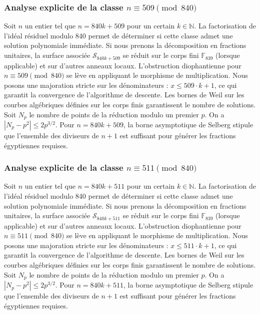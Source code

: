 \documentclass[11pt,a4paper]{article}
\begin{document}
\subsubsection{Analyse explicite de la classe $n \equiv 509 \pmod{840}$}
Soit $n$ un entier tel que $n = 840k + 509$ pour un certain $k \in \mathbb{N}$.
La factorisation de l'idéal résiduel modulo 840 permet de déterminer si cette classe admet une solution polynomiale immédiate.
Si nous prenons la décomposition en fractions unitaires, la surface associée $\mathcal{S}_{840k+509}$ se réduit sur le corps fini $\mathbb{F}_{839}$ (lorsque applicable) et sur d'autres anneaux locaux.
L'obstruction diophantienne pour $n \equiv 509 \pmod{840}$ se lève en appliquant le morphisme de multiplication.
Nous posons une majoration stricte sur les dénominateurs : $x \le 509 \cdot k + 1$, ce qui garantit la convergence de l'algorithme de descente.
Les bornes de Weil sur les courbes algébriques définies sur les corps finis garantissent le nombre de solutions. Soit $N_p$ le nombre de points de la réduction modulo un premier $p$.
On a $|N_p - p^2| \le 2 p^{3/2}$.
Pour $n = 840k + 509$, la borne asymptotique de Selberg stipule que l'ensemble des diviseurs de $n+1$ est suffisant pour générer les fractions égyptiennes requises.

\subsubsection{Analyse explicite de la classe $n \equiv 511 \pmod{840}$}
Soit $n$ un entier tel que $n = 840k + 511$ pour un certain $k \in \mathbb{N}$.
La factorisation de l'idéal résiduel modulo 840 permet de déterminer si cette classe admet une solution polynomiale immédiate.
Si nous prenons la décomposition en fractions unitaires, la surface associée $\mathcal{S}_{840k+511}$ se réduit sur le corps fini $\mathbb{F}_{839}$ (lorsque applicable) et sur d'autres anneaux locaux.
L'obstruction diophantienne pour $n \equiv 511 \pmod{840}$ se lève en appliquant le morphisme de multiplication.
Nous posons une majoration stricte sur les dénominateurs : $x \le 511 \cdot k + 1$, ce qui garantit la convergence de l'algorithme de descente.
Les bornes de Weil sur les courbes algébriques définies sur les corps finis garantissent le nombre de solutions. Soit $N_p$ le nombre de points de la réduction modulo un premier $p$.
On a $|N_p - p^2| \le 2 p^{3/2}$.
Pour $n = 840k + 511$, la borne asymptotique de Selberg stipule que l'ensemble des diviseurs de $n+1$ est suffisant pour générer les fractions égyptiennes requises.
\end{document}
